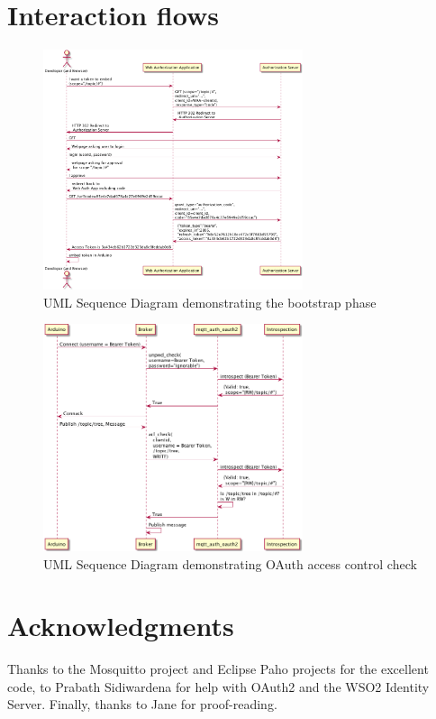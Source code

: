 \documentclass{IEEEtran}
\begin{document}
\section{Interaction flows}\label{app:int}
\begin{figure}[!t]
\centering
\includegraphics[width=3in]{bootstrap-sequence.png}
\caption{UML Sequence Diagram demonstrating the bootstrap phase}
\label{fig:bootstrap-sequence-diagram}
\end{figure}
\FloatBarrier
\begin{figure}[!t]
\centering
\includegraphics[width=3in]{runtime-sequence.png}
\caption{UML Sequence Diagram demonstrating OAuth access control check}
\label{fig:runtime-sequence-diagram}
\end{figure}
\FloatBarrier
\section*{Acknowledgments}
Thanks to the Mosquitto project and Eclipse Paho projects for the excellent code, to Prabath Sidiwardena for help with OAuth2 and the WSO2 Identity Server. Finally, thanks to Jane for proof-reading.




\end{document}
